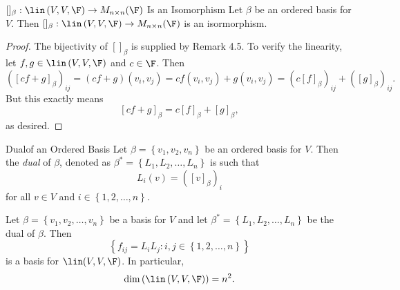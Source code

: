 \documentclass[linearalgebraII]{subfiles}
\begin{document}
    \clearpage
    \begin{theorem}{$[]_\beta:\lin\left( V,V,\F \right)\to M_{n\times n}(\F)$ Is an Isomorphism}
        Let $\beta$ be an ordered basis for $V$. Then $[]_\beta:\lin\left( V,V,\F \right)\to M_{n\times n}(\F)$ is an isormorphism.
    \end{theorem}

    \begin{proof}
        The bijectivity of $[]_\beta$ is supplied by Remark 4.5. To verify the linearity, let $f,g\in\lin\left( V,V,\F \right)$ and $c\in\F$. Then
        \begin{equation*}
            \left( \left[ cf+g \right] _\beta \right) _{ij} = \left( cf+g \right) \left( v_i,v_j \right) = cf\left( v_i,v_j \right) + g\left( v_i,v_j \right) = \left( c\left[ f \right]_\beta  \right)_{ij} + \left( \left[ g \right]_\beta  \right) _{ij}.
        \end{equation*}
        But this exactly means
        \begin{equation*}
            \left[ cf+g \right] _\beta = c\left[ f \right] _\beta + \left[ g \right] _\beta,
        \end{equation*}
        as desired.
    \end{proof}

    \begin{recall}{Dual}{of an Ordered Basis}
        Let $\beta = \left\lbrace v_1,v_2,v_n \right\rbrace $ be an ordered basis for $V$. Then the \emph{dual} of $\beta$, denoted as $\beta^* = \left\lbrace L_1,L_2,\ldots,L_n \right\rbrace $ is such that
        \begin{equation*}
            L_i\left( v \right) = \left( \left[ v \right] _\beta \right) _i
        \end{equation*}
        for all $v\in V$ and $i\in\left\lbrace 1,2,\ldots,n \right\rbrace$.
    \end{recall}

    \begin{cor}{}
        Let $\beta = \left\lbrace v_1,v_2,\ldots,v_n \right\rbrace$ be a basis for $V$ and let $\beta^* = \left\lbrace L_1,L_2,\ldots,L_n \right\rbrace $ be the dual of $\beta$. Then
        \begin{equation*}
            \left\lbrace f_{ij} = L_iL_j: i,j\in\left\lbrace 1,2,\ldots,n \right\rbrace  \right\rbrace 
        \end{equation*}
        is a basis for $\lin(V,V,\F)$. In particular,
        \begin{equation*}
            \dim\left( \lin\left( V,V,\F \right)  \right) = n^2.
        \end{equation*}
    \end{cor}	
\end{document}
